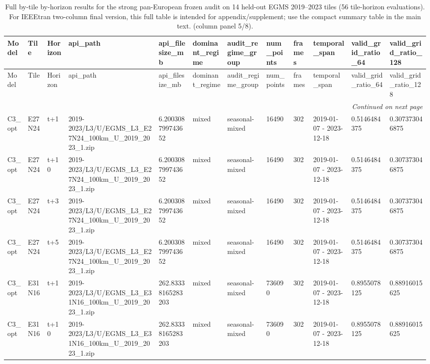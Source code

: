 \begin{landscape}
\scriptsize
\setlength{\LTleft}{0pt}
\setlength{\LTright}{0pt}
\begin{longtable}{llllllllllll}
\caption{Full by-tile by-horizon results for the strong pan-European frozen audit on 14 held-out EGMS 2019--2023 tiles (56 tile-horizon evaluations). For IEEEtran two-column final version, this full table is intended for appendix/supplement; use the compact summary table in the main text. (column panel 5/8).}\label{tab:e7_strong_by_tile_full_part5}\\
\toprule
Model & Tile & Horizon & api\_path & api\_filesize\_mb & dominant\_regime & audit\_regime\_group & num\_points & frames & temporal\_span & valid\_grid\_ratio\_64 & valid\_grid\_ratio\_128 \\
\midrule
\endfirsthead
\toprule
Model & Tile & Horizon & api\_path & api\_filesize\_mb & dominant\_regime & audit\_regime\_group & num\_points & frames & temporal\_span & valid\_grid\_ratio\_64 & valid\_grid\_ratio\_128 \\
\midrule
\endhead
\midrule
\multicolumn{12}{r}{\textit{Continued on next page}} \\
\endfoot
\bottomrule
\endlastfoot
C3\_opt & E27N24 & t+1 & 2019-2023/L3/U/EGMS\_L3\_E27N24\_100km\_U\_2019\_2023\_1.zip & 6.200308799743652 & mixed & seasonal-mixed & 16490 & 302 & 2019-01-07 - 2023-12-18 & 0.5146484375 & 0.307373046875 \\
C3\_opt & E27N24 & t+10 & 2019-2023/L3/U/EGMS\_L3\_E27N24\_100km\_U\_2019\_2023\_1.zip & 6.200308799743652 & mixed & seasonal-mixed & 16490 & 302 & 2019-01-07 - 2023-12-18 & 0.5146484375 & 0.307373046875 \\
C3\_opt & E27N24 & t+3 & 2019-2023/L3/U/EGMS\_L3\_E27N24\_100km\_U\_2019\_2023\_1.zip & 6.200308799743652 & mixed & seasonal-mixed & 16490 & 302 & 2019-01-07 - 2023-12-18 & 0.5146484375 & 0.307373046875 \\
C3\_opt & E27N24 & t+5 & 2019-2023/L3/U/EGMS\_L3\_E27N24\_100km\_U\_2019\_2023\_1.zip & 6.200308799743652 & mixed & seasonal-mixed & 16490 & 302 & 2019-01-07 - 2023-12-18 & 0.5146484375 & 0.307373046875 \\
C3\_opt & E31N16 & t+1 & 2019-2023/L3/U/EGMS\_L3\_E31N16\_100km\_U\_2019\_2023\_1.zip & 262.83338165283203 & mixed & seasonal-mixed & 736090 & 302 & 2019-01-07 - 2023-12-18 & 0.8955078125 & 0.88916015625 \\
C3\_opt & E31N16 & t+10 & 2019-2023/L3/U/EGMS\_L3\_E31N16\_100km\_U\_2019\_2023\_1.zip & 262.83338165283203 & mixed & seasonal-mixed & 736090 & 302 & 2019-01-07 - 2023-12-18 & 0.8955078125 & 0.88916015625 \\

\end{longtable}
\end{landscape}
